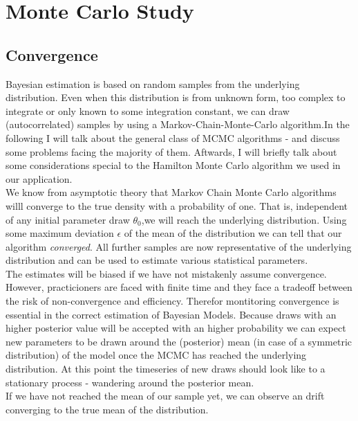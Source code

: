 \section{Monte Carlo Study}

\subsection{Convergence}

Bayesian estimation is based on random samples from the underlying distribution. Even when this distribution is from unknown form, too complex to integrate or only known to some integration constant, we can draw (autocorrelated) samples by using a Markov-Chain-Monte-Carlo algorithm.In the following I will talk about the general class of MCMC algorithms - and discuss some problems facing the majority of them. Aftwards, I will briefly talk about some considerations special to the Hamilton Monte Carlo algorithm we used in our application.\\
 We know from asymptotic theory that Markov Chain Monte Carlo algorithms willl converge to the true density with a probability of one. That is, independent of  any initial parameter draw $\theta_0$,we will reach the underlying distribution. Using some maximum deviation $\epsilon$ of the mean of the distribution we can tell that our algorithm \emph{converged}. All further samples are now representative of the underlying distribution and can be used to estimate various statistical parameters. \\
The estimates will be biased if we have not mistakenly assume convergence. However, practicioners are faced with finite time and they face a tradeoff between the risk of non-convergence and efficiency.   
Therefor montitoring convergence is essential in the correct estimation of Bayesian Models.
Because draws with an higher posterior value will be accepted with an higher probability we can expect new parameters to be drawn around the (posterior) mean (in case of a symmetric distribution) of the model once the MCMC has reached the underlying distribution.
At this point the timeseries of new draws should look like to a stationary process - wandering around the posterior mean.\\ 
If we have not reached the mean of our sample yet, we can observe an drift converging to the true mean of the distribution.\\

